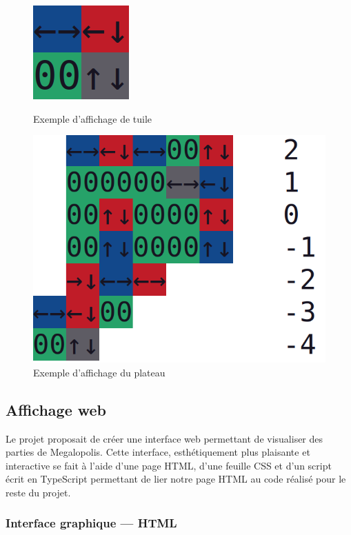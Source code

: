 \begin{figure}[h]
    \centering
    \begin{minipage}{0.45\textwidth}
        \centering
        \includegraphics[width=0.5\linewidth]{images/Affichage/tile_termianl.png}
        \caption{Exemple d'affichage de tuile}
        \label{fig:tile_terminal}
    \end{minipage}\hfill
    \begin{minipage}{0.45\textwidth}
        \centering
        \includegraphics[width=0.5\linewidth]{images/Affichage/board_terminal.png}
        \caption{Exemple d'affichage du plateau}
        \label{fig:board_terminal}
    \end{minipage}
\end{figure}

\subsection{Affichage web}

Le projet proposait de créer une interface web permettant de visualiser des parties de Megalopolis. Cette interface, esthétiquement plus plaisante et interactive se fait à l'aide d'une page HTML, d'une feuille CSS et d'un script écrit en TypeScript permettant de lier notre page HTML au code réalisé pour le reste du projet.

\subsubsection{Interface graphique — HTML}

